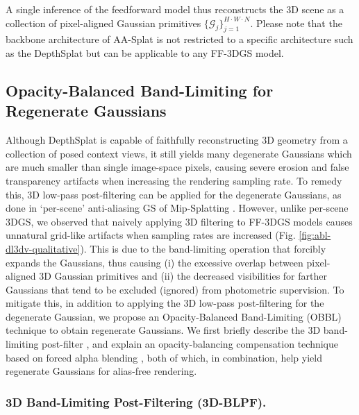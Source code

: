\documentclass[runningheads]{llncs}
\begin{document}
A single inference of the feedforward model thus reconstructs the 3D scene as a collection of pixel-aligned Gaussian primitives $\{\mathcal{G}_j\}_{j=1}^{H\cdot W\cdot N}$.
Please note that the backbone architecture of AA-Splat is not restricted to a specific architecture such as the DepthSplat \cite{xu2025depthsplat} but can be applicable to any FF-3DGS model. 

\subsection{Opacity-Balanced Band-Limiting for Regenerate Gaussians}
\label{sec:combined-filter}
Although DepthSplat \cite{xu2025depthsplat} is capable of faithfully reconstructing 3D geometry from a collection of posed context views, it still yields many degenerate Gaussians which are much smaller than single image-space pixels, causing severe erosion and false transparency artifacts when increasing the rendering sampling rate. To remedy this, 3D low-pass post-filtering can be applied for the degenerate Gaussians, as done in `per-scene' anti-aliasing GS of Mip-Splatting  \cite{yu2024mip}.
However, unlike per-scene 3DGS, we observed that naively applying 3D filtering to FF-3DGS models causes unnatural grid-like artifacts when sampling rates are increased (Fig. \ref{fig:abl-dl3dv-qualitative}). This is due to the band-limiting operation that forcibly expands the Gaussians, thus causing (i) the excessive overlap between pixel-aligned 3D Gaussian primitives and (ii) the decreased visibilities for farther Gaussians that tend to be excluded (ignored) from photometric supervision.
To mitigate this, in addition to applying the 3D low-pass post-filtering for the degenerate Gaussian, we propose an Opacity-Balanced Band-Limiting (OBBL) technique to obtain regenerate Gaussians. We first briefly describe the 3D band-limiting post-filter \cite{yu2024mip}, and explain an opacity-balancing compensation technique based on forced alpha blending \cite{he2026surfsplat}, both of which, in combination, help yield regenerate Gaussians for alias-free rendering.

\subsubsection{3D Band-Limiting Post-Filtering (3D-BLPF).}
\end{document}
